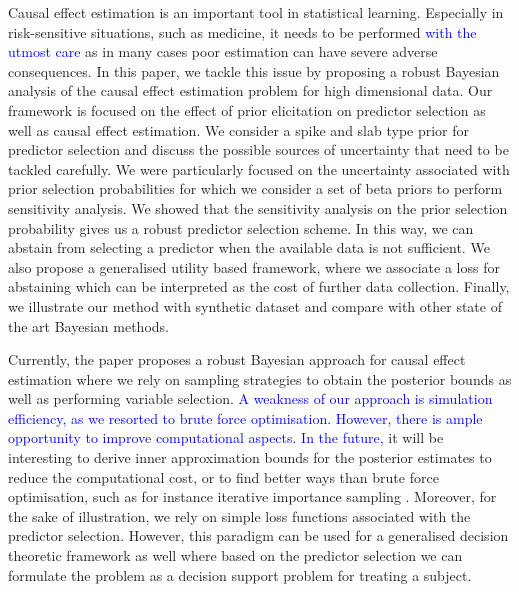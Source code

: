 \documentclass[preprint,12pt]{elsarticle}
\newcommand{\added}[1]{\textcolor{blue}{#1}}
\begin{document}
Causal effect estimation is an important tool in statistical learning.
Especially in risk-sensitive situations, such as medicine, it needs to
be performed \added{with the utmost care} as in many cases poor estimation can have severe adverse consequences.
In this paper, we tackle this issue by proposing a robust Bayesian analysis of the causal 
effect estimation problem for high dimensional data. Our 
framework is focused on the effect of prior elicitation on
predictor selection
as well as causal effect estimation. We consider a spike and slab type
prior for predictor selection and discuss the possible sources of uncertainty that
need to be tackled carefully. We were particularly focused on the uncertainty associated
with prior selection probabilities for which we consider a set of beta priors to perform
sensitivity analysis. We showed that the sensitivity analysis on the prior selection probability
gives us a robust predictor selection scheme. In this way, we can abstain from selecting
a predictor when the available data is not sufficient. We also propose a generalised
utility based framework, where we associate a loss for abstaining which can be interpreted 
as the cost of further data collection. Finally, we illustrate our method with synthetic dataset
and compare with other state of the art Bayesian methods. 


Currently, the paper proposes a robust Bayesian approach for causal effect estimation where
we rely on sampling strategies to obtain the posterior bounds as well as performing 
variable selection.
\added{%
A weakness of our approach is simulation efficiency,
as we resorted to brute force optimisation.
However, there is ample opportunity to improve computational aspects.%
}
\added{In the future,} it will be interesting to derive inner approximation bounds
for the posterior estimates to reduce the computational cost,
or to find better ways than brute force optimisation, such as for instance iterative importance sampling \citep{cruz22_importance}. Moreover, for the sake of
illustration, we rely on simple loss functions
associated with the predictor selection. However,
this paradigm can be used for a generalised
decision theoretic framework as well where based on
the predictor selection we can formulate the 
problem as a decision support problem for treating a subject.
\end{document}

